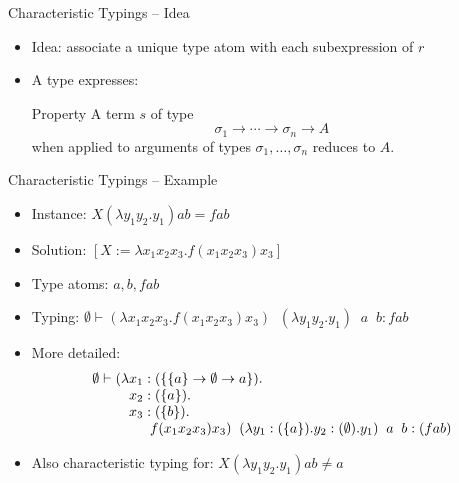 \documentclass{beamer}
\renewcommand{\:}{\mbox{\,:\,}\xspace}
\begin{document}
\begin{frame}{Characteristic Typings -- Idea}
  \begin{itemize}
  \item Idea: associate a unique type atom with each subexpression of $r$
  \item A type expresses:\\[2ex]
    \begin{block}{Property}
      A term $s$ of type $$\sigma_1\to\cdots\to\sigma_n\to A$$ when applied to arguments of types $\sigma_1,\ldots,\sigma_n$ reduces to $A$.      
    \end{block}

    
\end{itemize}
\end{frame}



\begin{frame}{Characteristic Typings -- Example}

  \begin{itemize}
  \item Instance: $X(\lambda y_1y_2.y_1)ab = fab$
  \item Solution: $[X := \lambda x_1x_2x_3.f(x_1x_2x_3)x_3]$
  \item Type atoms: $a, b, fab$
  \item Typing: $\emptyset\vdash (\lambda x_1x_2x_3.f(x_1x_2x_3)x_3)\;\;(\lambda y_1y_2.y_1)\;\;a\;\;b : fab$
    
  \item More detailed:
    \begin{displaymath}
      \begin{array}{l@{}l}
        \emptyset\vdash
        (\lambda & x_1:(\{\{a\}\to\emptyset\to a\}).\\ & 
                                                                                                   x_2:(\{a\}).\\ &
                                                                                                   x_3:(\{b\}).\\ &

         \multicolumn{1}{l}{~~~f(x_1x_2x_3)x_3)\;\;(\lambda y_1:(\{a\}).y_2:(\emptyset).y_1)\;\;a\;\;b : (fab)}
      \end{array}
    \end{displaymath}
  \item Also characteristic typing for: $X(\lambda y_1y_2.y_1)ab \not= a$
    
  \end{itemize}

  \end{frame}
\end{document}
